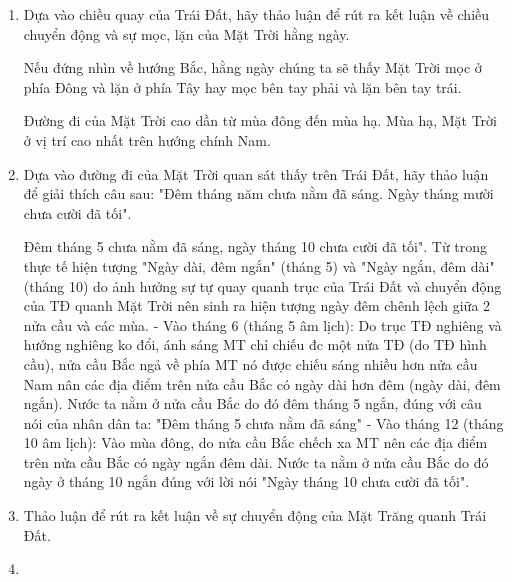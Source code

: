 \begin{enumerate}[label=\bfseries Câu \arabic*:]
{		Mặt Trăng vào ngày rằm là tròn nhất.
	}
	\item {}
	

	{
		Dựa vào chiều quay của Trái Đất, hãy thảo luận để rút ra kết luận về chiều chuyển động và sự mọc, lặn của Mặt Trời hằng ngày.
	}
	
	\hideall
	{
		Nếu đứng nhìn về hướng Bắc, hằng ngày chúng ta sẽ thấy Mặt Trời mọc ở phía Đông và lặn ở phía Tây hay mọc bên tay phải và lặn bên tay trái. 
		
		Đường đi của Mặt Trời cao dần từ mùa đông đến mùa hạ. Mùa hạ, Mặt Trời ở vị trí cao nhất trên hướng chính Nam.
	}
	\item {}
	
	
	{
		Dựa vào đường đi của Mặt Trời quan sát thấy trên Trái Đất, hãy thảo luận để giải thích câu sau: "Đêm tháng năm chưa nằm đã sáng. Ngày tháng mười chưa cười đã tối".
	}
	
	\hideall
	{
		Đêm tháng 5 chưa nằm đã sáng, ngày tháng 10 chưa cười đã tối". Từ trong thực tế hiện tượng "Ngày dài, đêm ngắn" (tháng 5) và "Ngày ngắn, đêm dài" (tháng 10) do ảnh hưởng sự tự quay quanh trục của Trái Đất và chuyển động của TĐ quanh Mặt Trời nên sinh ra hiện tượng ngày đêm chênh lệch giữa 2 nửa cầu và các mùa. - Vào tháng 6 (tháng 5 âm lịch): Do trục TĐ nghiêng và hướng nghiêng ko đổi, ánh sáng MT chỉ chiếu đc một nửa TĐ (do TĐ hình cầu), nửa cầu Bắc ngả về phía MT nó được chiếu sáng nhiều hơn nửa cầu Nam nân các địa điểm trên nửa cầu Bắc có ngày dài hơn đêm (ngày dài, đêm ngắn). Nước ta nằm ở nửa cầu Bắc do đó đêm tháng 5 ngắn, đúng với câu nói của nhân dân ta: "Đêm tháng 5 chưa nằm đã sáng" - Vào tháng 12 (tháng 10 âm lịch): Vào mùa đông, do nửa cầu Bắc chếch xa MT nên các địa điểm trên nửa cầu Bắc có ngày ngắn đêm dài. Nước ta nằm ở nửa cầu Bắc do đó ngày ở tháng 10 ngắn đúng với lời nói "Ngày tháng 10 chưa cười đã tối".
	}
	\item {}
	
	{
		Thảo luận để rút ra kết luận về sự chuyển động của Mặt Trăng quanh Trái Đất.
	}
	
	
	
	\item {}
	


\end{enumerate}
